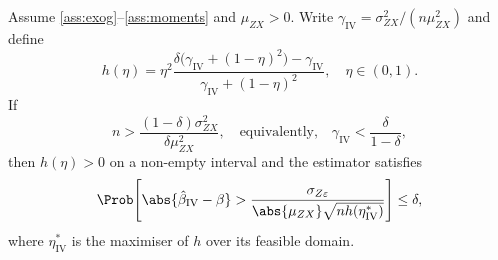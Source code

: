 \begin{theorem}
\label{thm:iv_cantelli}
    Assume \ref{ass:exog}--\ref{ass:moments} and $\mu_{ZX}>0$. Write $\gamma_{\mathrm{IV}} = \sigma_{ZX}^2/(n\mu_{ZX}^2)$ and define
    \begin{equation}
    \label{eq:h_eta_iv}
        h(\eta) = \eta^2
        \frac{\delta\bigl(\gamma_{\mathrm{IV}}+(1-\eta)^2\bigr)-\gamma_{\mathrm{IV}}}
            {\gamma_{\mathrm{IV}}+(1-\eta)^2},
        \quad \eta\in(0,1).
    \end{equation}
    If
    \begin{equation}
    \label{eq:iv_cantelli_strength}
        n > \frac{(1-\delta)\sigma_{ZX}^2}{\delta\mu_{ZX}^2}, \quad\text{equivalently,}\quad \gamma_{\mathrm{IV}} < \frac{\delta}{1-\delta},
    \end{equation}
    then $h(\eta)>0$ on a non-empty interval and the estimator satisfies
    \begin{equation}
    \label{eq:iv_cantelli_bound}
        \Prob\!\left[\abs{\hat{\beta}_{\mathrm{IV}} - \beta}
            > \frac{\sigma_{Z\varepsilon}}{\abs{\mu_{ZX}}\sqrt{nh(\eta^*_{\mathrm{IV}})}}
            \right] \leq \delta,
    \end{equation}
    where $\eta^*_{\mathrm{IV}}$ is the maximiser of $h$ over its feasible domain.
\end{theorem}

